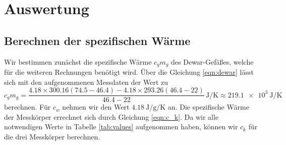 \section{Auswertung}
\label{sec:Auswertung}
\subsection{Berechnen der spezifischen Wärme}
Wir bestimmen zunächst die spezifische Wärme $c_gm_g$ des Dewar-Gefäßes, welche für die weiteren Rechnungen benötigt wird.
Über die Gleichung \eqref{eqn:dewar}
lässt sich mit den aufgenommenen Messdaten der Wert zu
\begin{equation} %
    c_gm_g = \frac{4.18\times300.16(74.5-46.4)-4.18\times293.26(46.4-22)}{46.4-22} \, \si{\joule\per\kelvin} \approx \SI{219.1e3}{\joule\per\kelvin} %
\end{equation} %
berechnen.
Für $c_w$ nehmen wir den Wert $\SI{4.18}{\joule\per\g\per\kelvin}$ an\cite{Versuchsanleitung}. %
Die spezifische Wärme der Messkörper errechnet sich durch Gleichung \eqref{eqn:c_k}.
Da wir alle notwendigen Werte in Tabelle \ref{tab:values} aufgenommen haben, können wir $c_k$ für die drei Messkörper berechnen. %
